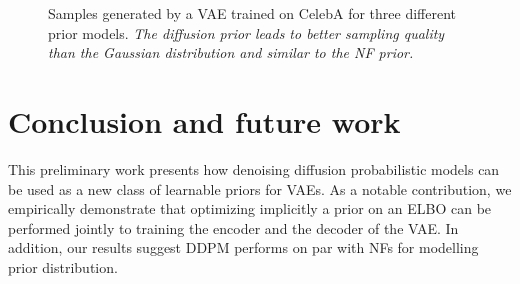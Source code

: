 \begin{figure}
    \centering
    \label{fig:celeba_classical}
    \label{fig:celeba_NF}
    \label{fig:celeba_DDPM}

    \caption{Samples generated by a VAE trained on CelebA for three different prior models. \textit{The diffusion prior leads to better sampling quality than the Gaussian distribution and similar to the NF prior.}}\label{fig:CelebA}
    \vspace{1em}
\end{figure}

\section{Conclusion and future work}
This preliminary work presents how denoising diffusion probabilistic models can be used as a new class of learnable priors for VAEs. As a notable contribution, we empirically demonstrate that optimizing implicitly a prior on an ELBO can be performed jointly to training the encoder and the decoder of the VAE. In addition, our results suggest DDPM performs on par with NFs for modelling prior distribution.

